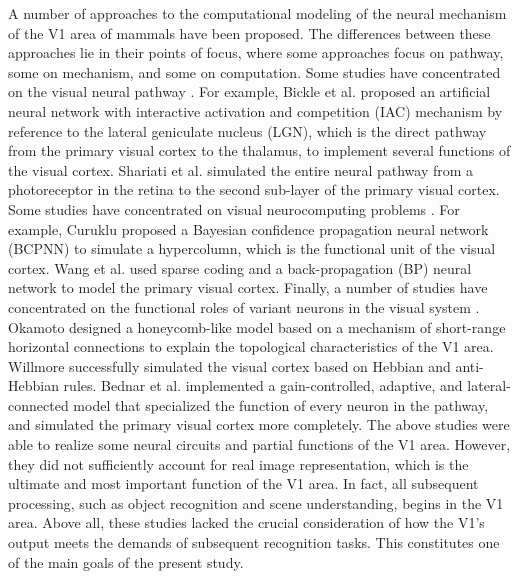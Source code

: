 \documentclass{article}
\begin{document}
A number of approaches to the computational modeling of the neural mechanism of the V1 area of mammals have been proposed. 
The differences between these approaches lie in their points of focus, 
where some approaches focus on pathway, some on mechanism, and some on computation. 
Some studies have concentrated on the visual neural pathway 
\cite{bickle1999,shariati2012,nakagama2004,harvey2008}. 
For example, Bickle et al. \cite{bickle1999} proposed an artificial neural network with interactive activation and competition (IAC) mechanism by reference to the lateral geniculate nucleus (LGN), 
which is the direct pathway from the primary visual cortex to the thalamus, 
to implement several functions of the visual cortex. 
Shariati et al. \cite{shariati2012} simulated the entire neural pathway from a photoreceptor in the retina to the second sub-layer of the primary visual cortex. 
Some studies have concentrated on visual neurocomputing problems 
\cite{curuklu2002,wang2011,li2005,mihalas2011,ramirez2013}. 
For example, Curuklu \cite{curuklu2002} proposed a Bayesian confidence propagation neural network (BCPNN) to simulate a hypercolumn, which is the functional unit of the visual cortex. 
Wang et al. \cite{wang2011} used sparse coding and a back-propagation (BP) neural network to model the primary visual cortex. 
Finally, a number of studies have concentrated on the functional roles of variant neurons in the visual system \cite{okamoto2004,willmore2012,bednar2012,law2011,giacomantonio2010,zhao2010,yan2012,piech2013,song2013}. 
Okamoto \cite{okamoto2004} designed a honeycomb-like model based on a mechanism of short-range horizontal connections to explain the topological characteristics of the V1 area. 
Willmore \cite{willmore2012} successfully simulated the visual cortex based on Hebbian and anti-Hebbian rules. 
Bednar et al. \cite{bednar2012,law2011} implemented a gain-controlled, adaptive, 
and lateral-connected model that specialized the function of every neuron in the pathway, 
and simulated the primary visual cortex more completely. 
The above studies were able to realize some neural circuits and partial functions of the V1 area.
However, they did not sufficiently account for real image representation, 
which is the ultimate and most important function of the V1 area. 
In fact, all subsequent processing, such as object recognition and scene understanding, 
begins in the V1 area. 
Above all, these studies lacked the crucial consideration of how the V1's output meets the demands of subsequent recognition tasks. 
This constitutes one of the main goals of the present study.
\end{document}
